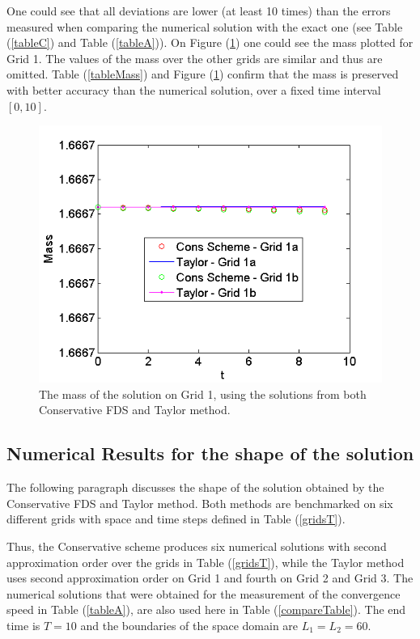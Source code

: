 \documentclass[%
 aip,
cp,  
 amsmath,amssymb,
 reprint,
]{iopconfser}
\newcommand{\rf}[1]{(\ref{#1})}
\begin{document}
One could see that all deviations are lower (at least 10 times) than the errors measured when comparing the numerical solution with the exact one (see Table \rf{tableC} and Table \rf{tableA}). On Figure \rf{massFig} one could see the mass plotted for Grid 1. The values of the mass over the other grids are similar and thus are omitted. Table \rf{tableMass} and Figure \rf{massFig} confirm that the mass is preserved with better accuracy than the numerical solution, over a fixed time interval $[0, 10]$.

\begin{figure}[ht]\vspace{0.2cm}
  \centering
  \includegraphics[width=0.5\linewidth]{mass.png}
\caption{The mass of the solution on Grid 1, using the solutions from both Conservative FDS and Taylor method.}
\label{massFig}
\end{figure}

\iffalse
\subsection{Numerical Results for the shape of the solution}

The following paragraph discusses the shape of the solution obtained by the Conservative FDS and Taylor method. Both methods are benchmarked on six different grids with space and time steps defined in Table \rf{gridsT}.

Thus, the Conservative scheme produces six numerical solutions with second approximation order over the grids in Table \rf{gridsT}, while the Taylor method uses second approximation order on Grid 1 and fourth on Grid 2 and Grid 3. The numerical solutions that were obtained for the measurement of the convergence speed in Table \rf{tableA}, are also used here in Table \rf{compareTable}. The end time is $T=10$ and the boundaries of the space domain are $L_1 = L_2 = 60$.
\end{document}
